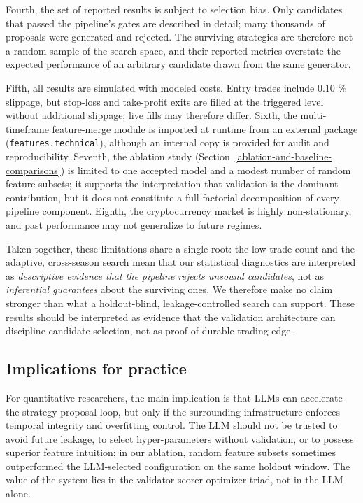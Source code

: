 \documentclass[11pt,a4paper]{article}
\begin{document}
Fourth, the set of reported results is subject to selection bias. Only candidates that passed the pipeline's gates are described in detail; many thousands of proposals were generated and rejected. The surviving strategies are therefore not a random sample of the search space, and their reported metrics overstate the expected performance of an arbitrary candidate drawn from the same generator.

Fifth, all results are simulated with modeled costs. Entry trades include 0.10 \% slippage, but stop-loss and take-profit exits are filled at the triggered level without additional slippage; live fills may therefore differ. Sixth, the multi-timeframe feature-merge module is imported at runtime from an external package (\texttt{features.technical}), although an internal copy is provided for audit and reproducibility. Seventh, the ablation study (Section~\ref{ablation-and-baseline-comparisons}) is limited to one accepted model and a modest number of random feature subsets; it supports the interpretation that validation is the dominant contribution, but it does not constitute a full factorial decomposition of every pipeline component. Eighth, the cryptocurrency market is highly non-stationary, and past performance may not generalize to future regimes.

Taken together, these limitations share a single root: the low trade count and the adaptive, cross-season search mean that our statistical diagnostics are interpreted as \emph{descriptive evidence that the pipeline rejects unsound candidates}, not as \emph{inferential guarantees} about the surviving ones. We therefore make no claim stronger than what a holdout-blind, leakage-controlled search can support. These results should be interpreted as evidence that the validation architecture can discipline candidate selection, not as proof of durable trading edge.

\subsection{Implications for practice}\label{implications-for-practice}

For quantitative researchers, the main implication is that LLMs can accelerate the strategy-proposal loop, but only if the surrounding infrastructure enforces temporal integrity and overfitting control. The LLM should not be trusted to avoid future leakage, to select hyper-parameters without validation, or to possess superior feature intuition; in our ablation, random feature subsets sometimes outperformed the LLM-selected configuration on the same holdout window. The value of the system lies in the validator-scorer-optimizer triad, not in the LLM alone.
\end{document}
